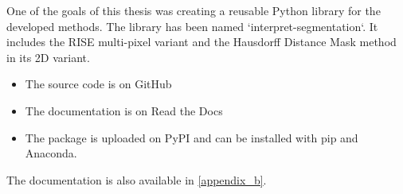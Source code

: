 One of the goals of this thesis was creating a reusable Python library for the developed methods.
The library has been named `interpret-segmentation`. It includes the RISE multi-pixel variant and the Hausdorff Distance Mask method
in its 2D variant.

\begin{itemize}
    \item The source code is on GitHub \cite{library_github}
    \item The documentation is on Read the Docs \cite{library_rtd}
    \item The package is uploaded on PyPI \cite{libraray_pypi} and can be installed with pip and Anaconda.
\end{itemize}

The documentation is also available in \autoref{appendix_b}.
